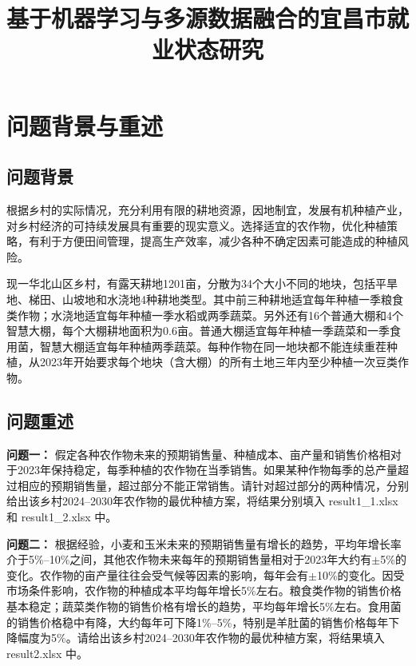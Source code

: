 \documentclass[withoutpreface,bwprint]{cumcmthesis} %
\title{基于机器学习与多源数据融合的宜昌市就业状态研究}
\begin{document}
\maketitle
\begin{abstract}

\end{abstract}





\section{问题背景与重述}

\subsection{问题背景}

根据乡村的实际情况，充分利用有限的耕地资源，因地制宜，发展有机种植产业，对乡村经济的可持续发展具有重要的现实意义。选择适宜的农作物，优化种植策略，有利于方便田间管理，提高生产效率，减少各种不确定因素可能造成的种植风险。

现一华北山区乡村，有露天耕地1201亩，分散为34个大小不同的地块，包括平旱地、梯田、山坡地和水浇地4种耕地类型。其中前三种耕地适宜每年种植一季粮食类作物；水浇地适宜每年种植一季水稻或两季蔬菜。另外还有16个普通大棚和4个智慧大棚，每个大棚耕地面积为0.6亩。普通大棚适宜每年种植一季蔬菜和一季食用菌，智慧大棚适宜每年种植两季蔬菜。每种作物在同一地块都不能连续重茬种植，从2023年开始要求每个地块（含大棚）的所有土地三年内至少种植一次豆类作物。

\subsection{问题重述}


\textbf{问题一：} 假定各种农作物未来的预期销售量、种植成本、亩产量和销售价格相对于2023年保持稳定，每季种植的农作物在当季销售。如果某种作物每季的总产量超过相应的预期销售量，超过部分不能正常销售。请针对超过部分的两种情况，分别给出该乡村2024--2030年农作物的最优种植方案，将结果分别填入 result1\_1.xlsx 和 result1\_2.xlsx 中。

\textbf{问题二：} 根据经验，小麦和玉米未来的预期销售量有增长的趋势，平均年增长率介于5\%--10\%之间，其他农作物未来每年的预期销售量相对于2023年大约有$\pm$5\%的变化。农作物的亩产量往往会受气候等因素的影响，每年会有$\pm$10\%的变化。因受市场条件影响，农作物的种植成本平均每年增长5\%左右。粮食类作物的销售价格基本稳定；蔬菜类作物的销售价格有增长的趋势，平均每年增长5\%左右。食用菌的销售价格稳中有降，大约每年可下降1\%--5\%，特别是羊肚菌的销售价格每年下降幅度为5\%。请给出该乡村2024--2030年农作物的最优种植方案，将结果填入 result2.xlsx 中。
\end{document}
